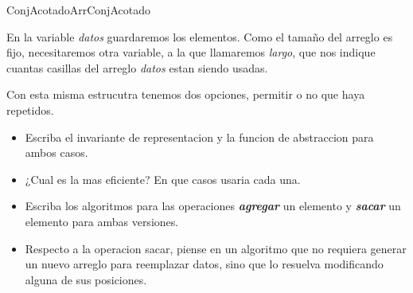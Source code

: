 \documentclass[10pt,a4paper]{article}
\begin{document}
\begin{design}{ConjAcotadoArr}{ConjAcotado}
\end{design}
{\salto{0em}En la variable \emph{datos} guardaremos los elementos. Como el tamaño del arreglo es fijo, 
necesitaremos otra variable, a la que llamaremos \emph{largo}, 
que nos indique cuantas casillas del arreglo \emph{datos} estan siendo usadas.}
{\par Con esta misma estrucutra tenemos dos opciones, permitir o no que haya repetidos.}
\begin{itemize}
    \item Escriba el invariante de representacion y la funcion de abstraccion para ambos casos.
    \item ¿Cual es la mas eficiente? En que casos usaria cada una.
    \item Escriba los algoritmos para las operaciones \emph{\bfseries agregar} un elemento y \emph{\bfseries sacar} un elemento para ambas versiones.
    \item Respecto a la operacion sacar, piense en un algoritmo que no requiera generar un nuevo arreglo para reemplazar datos, sino que lo resuelva modificando alguna de sus posiciones.
\end{itemize}
\end{document}
